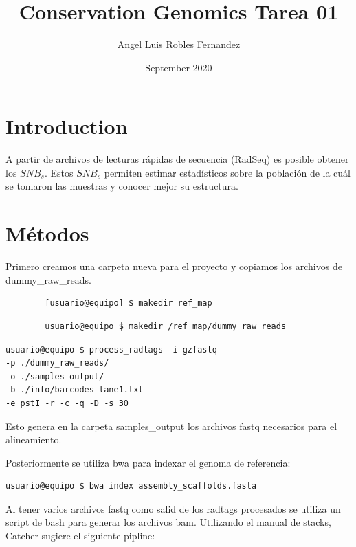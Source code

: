 \documentclass{article}
\title{Conservation Genomics Tarea 01}
\author{Angel Luis Robles Fernandez}
\date{September 2020}
\begin{document}
\maketitle

\section{Introduction}

A partir de archivos de lecturas rápidas de secuencia (RadSeq) es posible obtener los $SNB_s$. Estos $SNB_s$ permiten estimar estadísticos sobre la población de la cuál se tomaron las muestras y conocer mejor su estructura.


\section{Métodos}

Primero creamos una carpeta  nueva para el proyecto y copiamos los archivos de dummy\_raw\_reads.
\begin{verbatim}
        [usuario@equipo] $ makedir ref_map
\end{verbatim}

\begin{verbatim}
        usuario@equipo $ makedir /ref_map/dummy_raw_reads
\end{verbatim}

\begin{verbatim}
usuario@equipo $ process_radtags -i gzfastq 
-p ./dummy_raw_reads/
-o ./samples_output/
-b ./info/barcodes_lane1.txt
-e pstI -r -c -q -D -s 30
\end{verbatim}

Esto genera en la carpeta samples\_output los archivos fastq necesarios para el alineamiento.

Posteriormente se utiliza bwa para indexar el genoma de referencia:

\begin{verbatim}
usuario@equipo $ bwa index assembly_scaffolds.fasta
\end{verbatim}

Al tener varios archivos fastq como salid de los radtags procesados se utiliza un script de bash para generar los archivos bam. Utilizando el manual de stacks, Catcher sugiere el siguiente pipline:
\end{document}
